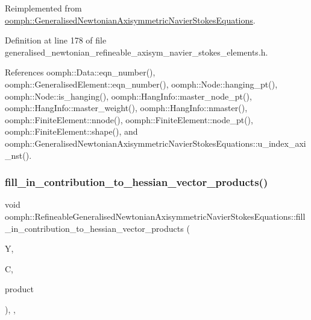 Reimplemented from \hyperlink{classoomph_1_1GeneralisedNewtonianAxisymmetricNavierStokesEquations_a115dec50e9fc5d82449a327d420c9790}{oomph\+::\+Generalised\+Newtonian\+Axisymmetric\+Navier\+Stokes\+Equations}.



Definition at line 178 of file generalised\+\_\+newtonian\+\_\+refineable\+\_\+axisym\+\_\+navier\+\_\+stokes\+\_\+elements.\+h.



References oomph\+::\+Data\+::eqn\+\_\+number(), oomph\+::\+Generalised\+Element\+::eqn\+\_\+number(), oomph\+::\+Node\+::hanging\+\_\+pt(), oomph\+::\+Node\+::is\+\_\+hanging(), oomph\+::\+Hang\+Info\+::master\+\_\+node\+\_\+pt(), oomph\+::\+Hang\+Info\+::master\+\_\+weight(), oomph\+::\+Hang\+Info\+::nmaster(), oomph\+::\+Finite\+Element\+::nnode(), oomph\+::\+Finite\+Element\+::node\+\_\+pt(), oomph\+::\+Finite\+Element\+::shape(), and oomph\+::\+Generalised\+Newtonian\+Axisymmetric\+Navier\+Stokes\+Equations\+::u\+\_\+index\+\_\+axi\+\_\+nst().

\mbox{\label{classoomph_1_1RefineableGeneralisedNewtonianAxisymmetricNavierStokesEquations_a7794ad4a3ea19be7604d7c8884debe70}} 
\subsubsection{\texorpdfstring{fill\+\_\+in\+\_\+contribution\+\_\+to\+\_\+hessian\+\_\+vector\+\_\+products()}{fill\_in\_contribution\_to\_hessian\_vector\_products()}}
{\footnotesize\ttfamily void oomph\+::\+Refineable\+Generalised\+Newtonian\+Axisymmetric\+Navier\+Stokes\+Equations\+::fill\+\_\+in\+\_\+contribution\+\_\+to\+\_\+hessian\+\_\+vector\+\_\+products (\begin{DoxyParamCaption}\item[{\hyperlink{classoomph_1_1Vector}{Vector}$<$ double $>$ const \&}]{Y,  }\item[{\hyperlink{classoomph_1_1DenseMatrix}{Dense\+Matrix}$<$ double $>$ const \&}]{C,  }\item[{\hyperlink{classoomph_1_1DenseMatrix}{Dense\+Matrix}$<$ double $>$ \&}]{product }\end{DoxyParamCaption})\hspace{0.3cm}{\ttfamily [inline]}, {\ttfamily [private]}, {\ttfamily [virtual]}}



